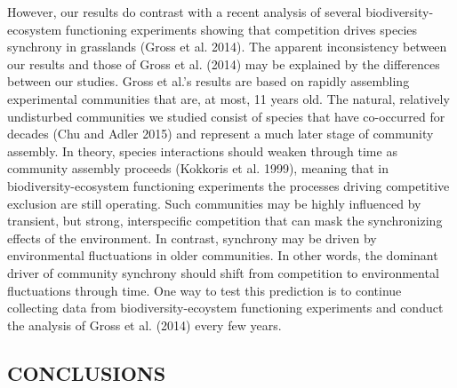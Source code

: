 \documentclass[12pt,]{article}
\begin{document}
However, our results do contrast with a recent analysis of several
biodiversity-ecosystem functioning experiments showing that competition
drives species synchrony in grasslands (Gross et al. 2014). The apparent
inconsistency between our results and those of Gross et al. (2014) may
be explained by the differences between our studies. Gross et al.'s
results are based on rapidly assembling experimental communities that
are, at most, 11 years old. The natural, relatively undisturbed
communities we studied consist of species that have co-occurred for
decades (Chu and Adler 2015) and represent a much later stage of
community assembly. In theory, species interactions should weaken
through time as community assembly proceeds (Kokkoris et al. 1999),
meaning that in biodiversity-ecosystem functioning experiments the
processes driving competitive exclusion are still operating. Such
communities may be highly influenced by transient, but strong,
interspecific competition that can mask the synchronizing effects of the
environment. In contrast, synchrony may be driven by environmental
fluctuations in older communities. In other words, the dominant driver
of community synchrony should shift from competition to environmental
fluctuations through time. One way to test this prediction is to
continue collecting data from biodiversity-ecoystem functioning
experiments and conduct the analysis of Gross et al. (2014) every few
years.

\subsection{CONCLUSIONS}\label{conclusions}
\end{document}
